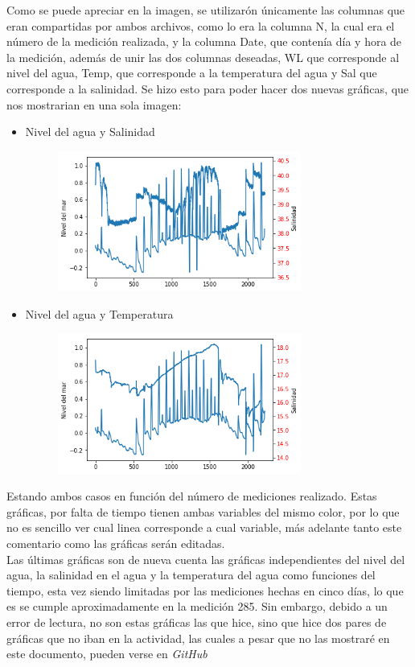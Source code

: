 \documentclass{article}
\begin{document}
Como se puede apreciar en la imagen, se utilizarón únicamente las columnas que eran compartidas por ambos archivos, como lo era la columna N, la cual era el número de la medición realizada, y la columna Date, que contenía día y hora de la medición, además de unir las dos columnas deseadas, WL que corresponde al nivel del agua, Temp, que corresponde a la temperatura del agua y Sal que corresponde a la salinidad. 
Se hizo esto para poder hacer dos nuevas gráficas, que nos mostrarian en una sola imagen:
\begin{itemize}
\item Nivel del agua y Salinidad
\begin{figure}[htb]
    \begin{center}
    \includegraphics[width=8cm]{NivelAgua-Sal.png}
    \end{center}
\end{figure} 

\vspace{2.5in}
\item Nivel del agua y Temperatura 
\begin{figure}[htb]
    \begin{center}
    \includegraphics[width=8cm]{AguaTemp.png}
    \end{center}
\end{figure} 
\end{itemize}

Estando ambos casos en función del número de mediciones realizado. Estas gráficas, por falta de tiempo tienen ambas variables del mismo color, por lo que no es sencillo ver cual linea corresponde a cual variable, más adelante tanto este comentario como las gráficas serán editadas. \\

Las últimas gráficas son de nueva cuenta las gráficas independientes del nivel del agua, la salinidad en el agua y la temperatura del agua como funciones del tiempo, esta vez siendo limitadas por las mediciones hechas en cinco días, lo que es se cumple aproximadamente en la medición 285. 
Sin embargo, debido a un error de lectura, no son estas gráficas las que hice, sino que hice dos pares de gráficas que no iban en la actividad, las cuales a pesar que no las mostraré en este documento, pueden verse en \textit{GitHub} 
\end{document}

